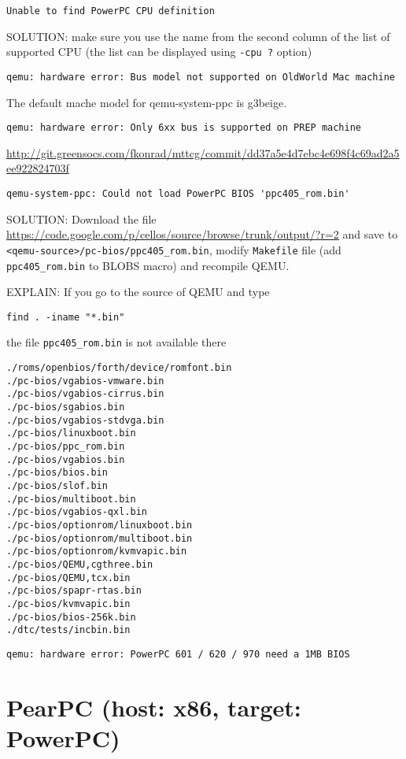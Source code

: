 \begin{verbatim}
Unable to find PowerPC CPU definition
\end{verbatim}
SOLUTION: make sure you use the name from the second column of the list of
supported CPU (the list can be displayed using \verb!-cpu ?! option)


\begin{verbatim}
qemu: hardware error: Bus model not supported on OldWorld Mac machine
\end{verbatim}
The default mache model for qemu-system-ppc is g3beige.

\begin{verbatim}
qemu: hardware error: Only 6xx bus is supported on PREP machine
\end{verbatim}
\url{http://git.greensocs.com/fkonrad/mttcg/commit/dd37a5e4d7ebc4e698f4c69ad2a5ee922824703f}


\begin{verbatim}
qemu-system-ppc: Could not load PowerPC BIOS 'ppc405_rom.bin'
\end{verbatim}
SOLUTION: Download the file
\url{https://code.google.com/p/cellos/source/browse/trunk/output/?r=2}
and save to \verb!<qemu-source>/pc-bios/ppc405_rom.bin!, modify \verb!Makefile!
file (add \verb!ppc405_rom.bin! to BLOBS macro) and recompile QEMU.

EXPLAIN: If you go to the source of QEMU and type
\begin{verbatim}
find . -iname "*.bin"
\end{verbatim}
the file \verb!ppc405_rom.bin! is not available there
\begin{verbatim}
./roms/openbios/forth/device/romfont.bin
./pc-bios/vgabios-vmware.bin
./pc-bios/vgabios-cirrus.bin
./pc-bios/sgabios.bin
./pc-bios/vgabios-stdvga.bin
./pc-bios/linuxboot.bin
./pc-bios/ppc_rom.bin
./pc-bios/vgabios.bin
./pc-bios/bios.bin
./pc-bios/slof.bin
./pc-bios/multiboot.bin
./pc-bios/vgabios-qxl.bin
./pc-bios/optionrom/linuxboot.bin
./pc-bios/optionrom/multiboot.bin
./pc-bios/optionrom/kvmvapic.bin
./pc-bios/QEMU,cgthree.bin
./pc-bios/QEMU,tcx.bin
./pc-bios/spapr-rtas.bin
./pc-bios/kvmvapic.bin
./pc-bios/bios-256k.bin
./dtc/tests/incbin.bin
\end{verbatim}


\begin{verbatim}
qemu: hardware error: PowerPC 601 / 620 / 970 need a 1MB BIOS
\end{verbatim}


\section{PearPC (host: x86, target: PowerPC)}
\label{sec:PearPC}

